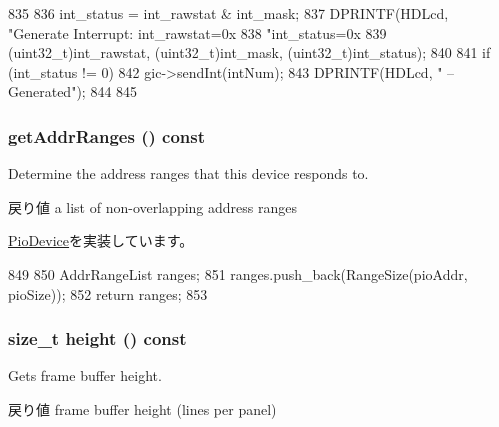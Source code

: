 \begin{DoxyCode}
835 {
836     int_status = int_rawstat & int_mask;
837     DPRINTF(HDLcd, "Generate Interrupt: int_rawstat=0x%
838             "int_status=0x%
839             (uint32_t)int_rawstat, (uint32_t)int_mask, (uint32_t)int_status);
840 
841     if (int_status != 0) {
842         gic->sendInt(intNum);
843         DPRINTF(HDLcd, " -- Generated\n");
844     }
845 }
\end{DoxyCode}
\hypertarget{classHDLcd_a36cf113d5e5e091ebddb32306c098fae}{
\subsubsection[{getAddrRanges}]{ getAddrRanges () const}}
\label{classHDLcd_a36cf113d5e5e091ebddb32306c098fae}
Determine the address ranges that this device responds to.

\begin{DoxyReturn}{戻り値}
a list of non-\/overlapping address ranges 
\end{DoxyReturn}


\hyperlink{classPioDevice_a6e967f8921e80748eb2be35b6b481a7e}{PioDevice}を実装しています。


\begin{DoxyCode}
849 {
850     AddrRangeList ranges;
851     ranges.push_back(RangeSize(pioAddr, pioSize));
852     return ranges;
853 }
\end{DoxyCode}
\hypertarget{classHDLcd_ac0e3c6ba1d3f8a8e50aa3e3897210a2b}{
\subsubsection[{height}]{\setlength{\rightskip}{0pt plus 5cm}size\_\-t height () const}}
\label{classHDLcd_ac0e3c6ba1d3f8a8e50aa3e3897210a2b}
Gets frame buffer height.

\begin{DoxyReturn}{戻り値}
frame buffer height (lines per panel) 
\end{DoxyReturn}



